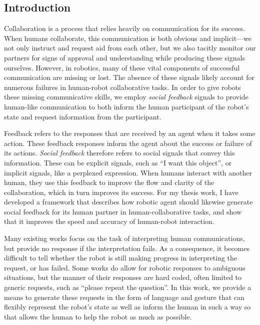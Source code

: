\documentclass{article}
\begin{document}
\maketitle
\begin{multicols}{2}
	
\section{Introduction}

Collaboration is a process that relies heavily on communication for its success. When humans collaborate, this communication is both obvious and implicit---we not only instruct and request aid from each other, but we also tacitly monitor our partners for signs of approval and understanding while producing these signals ourselves. However, in robotics, many of these vital components of successful communication are missing or lost. The absence of these signals likely account for numerous failures in human-robot collaborative tasks. In order to give robots these missing communicative skills, we employ \emph{social feedback} signals to provide human-like communication to both inform the human participant of the robot's state and request information from the participant. 

Feedback refers to the responses that are received by an agent when it takes some action. These feedback responses inform the agent about the success or failure of its actions. \emph{Social feedback} therefore refers to social signals that convey this information. These can be explicit signals, such as ``I want this object'', or implicit signals, like a perplexed expression. When humans interact with another human, they use this feedback to improve the flow and clarity of the collaboration, which in turn improves its success. For my thesis work, I have developed a framework that describes how robotic agent should likewise generate social feedback for its human partner in human-collaborative tasks, and show that it improves the speed and accuracy of human-robot interaction. 

Many existing works focus on the task of interpreting human communications\citep{tellex11,matuszek12,tellex12,misra14}, but provide no response if the interpretation fails. As a consequence, it becomes difficult to tell whether the robot is still making progress in interpreting the request, or has failed. Some works do allow for robotic responses to ambiguous situations, but the manner of their responses are hard coded, often limited to generic requests, such as ``please repeat the question''. In this work, we provide a means to generate these requests in the form of language and gesture that can flexibly represent the robot's state as well as inform the human in such a way so that allows the human to help the robot as much as possible. 


\end{multicols}
\end{document}

